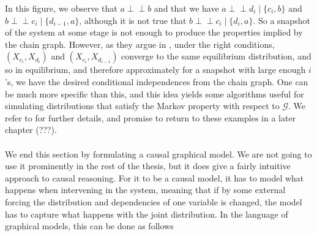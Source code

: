 \documentclass[11pt, a4paper]{memoir}
\theoremstyle{break}
\theoremstyle{break}
\theoremstyle{nonumberplain}
\newcommand{\indep}{\perp \!\!\! \perp}
\begin{document}
In this figure, we observe that $a\indep b$ and that we have $a\indep d_i\mid \{c_i,b\}$ and $b\indep c_i\mid\{d_{i-1},a\}$, although it is not true that $b\indep c_i\mid\{d_i,a\}$. So a snapshot of the system at some stage is not enough to produce the properties implied by the chain graph. However, as they argue in \cite{ChainGraph}, under the right conditions, $(X_{c_i},X_{d_i})$ and $(X_{c_i},X_{d_{i-1}})$ converge to the same equilibrium distribution, and so in equilibrium, and therefore approximately for a snapshot with large enough $i$'s, we have the desired conditional independences from the chain graph. One can be much more specific than this, and this idea yields some algorithms useful for simulating distributions that satisfy the Markov property with respect to $\mathcal{G}$. We refer to \cite{ChainGraph} for further details, and promise to return to these examples in a later chapter (???).\\\\
We end this section by formulating a causal graphical model. We are not going to use it prominently in the rest of the thesis, but it does give a fairly intuitive approach to causal reasoning. For it to be a causal model, it has to model what happens when intervening in the system, meaning that if by some external forcing the distribution and dependencies of one variable is changed, the model has to capture what happens with the joint distribution. In the language of graphical models, this can be done as follows
\end{document}
